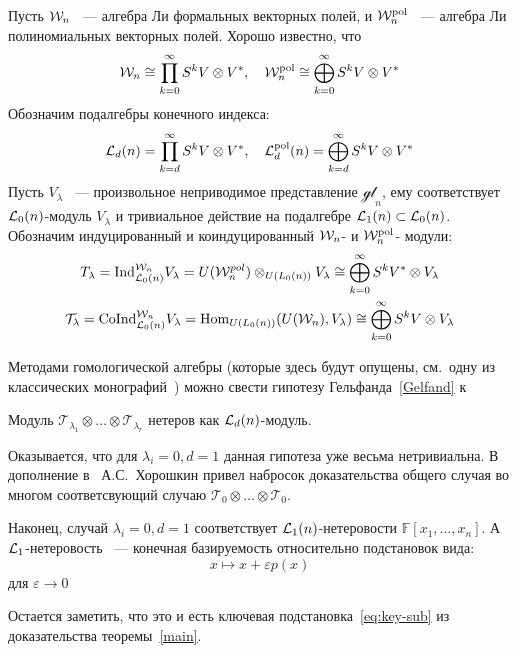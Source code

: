 Пусть $\mathcal{W}_n$ ~--- алгебра Ли формальных векторных полей, и $\mathcal{W}^{\mathrm{pol}}_n$ ~--- алгебра Ли полиномиальных векторных полей.
Хорошо известно, что
\[
    \mathcal{W}_n \cong \prod\limits_{k=0}^{\infty} S^k V\otimes V^*, \quad \mathcal{W}^{\mathrm{pol}}_n \cong \bigoplus\limits_{k=0}^{\infty} S^k V\otimes V^*
\]
Обозначим подалгебры конечного индекса:
\[
    \mathcal{L}_d(n) = \prod\limits_{k=d}^{\infty} S^k V\otimes V^*, \quad \mathcal{L}^{\mathrm{pol}}_d(n) = \bigoplus\limits_{k=d}^{\infty} S^k V\otimes V^*
\]
Пусть $V_{\lambda}$ ~--- произвольное неприводимое представление $\mathcal{gl}_n$, ему соответствует $\mathcal{L}_0(n)$-модуль $V_{\lambda}$ и тривиальное действие на подалгебре $\mathcal{L}_1(n)\subset\mathcal{L}_0(n)$.
Обозначим индуцированный и коиндуцированный $\mathcal{W}_n$- и $\mathcal{W}^{\mathrm{pol}}_n$- модули:
\begin{gather*}
    T_{\lambda} = \mathrm{Ind}^{\mathcal{W}_n}_{\mathcal{L}_0(n)} V_{\lambda} = U(\mathcal{W}_n^{pol}) \otimes_{U(L_0(n))} V_{\lambda} \cong \bigoplus_{k=0}^{\infty} S^k V^*\otimes V_{\lambda} \\
    \mathcal{T}_{\lambda} = \mathrm{CoInd}^{\mathcal{W}_n}_{\mathcal{L}_0(n)} V_{\lambda} = \operatorname{Hom}_{U(L_0(n))}(U(\mathcal{W}_n), V_{\lambda}) \cong \bigoplus_{k=0}^{\infty} S^k V\otimes V_{\lambda}
\end{gather*}

Методами гомологической алгебры (которые здесь будут опущены, см.\ одну из классических монографий~\cite{Fuks}) можно свести гипотезу Гельфанда~\ref{Gelfand} к

\vskip 0.1in\noindent
\begin{conjecture}
    Модуль $\mathcal{T}_{\lambda_1}\otimes\ldots\otimes\mathcal{T}_{\lambda_r}$ нетеров как $\mathcal{L}_d(n)$-модуль.
\end{conjecture}
\vskip 0.1in\noindent

Оказывается, что для $\lambda_i=0, d=1$ данная гипотеза уже весьма нетривиальна.
В дополнение в~\cite{Feigin-Kanel-Khoroshkin} А.С.\ Хорошкин привел набросок доказательства общего случая во многом соответсвующий случаю $\mathcal{T}_{0}\otimes\ldots\otimes\mathcal{T}_{0}$.

Наконец, случай $\lambda_i=0, d=1$ соответствует $\mathcal{L}_1(n)$-нетеровости $\mathbb{F}[x_1, \ldots, x_n]$.
А $\mathcal{L}_1$-нетеровость ~--- конечная базируемость относительно подстановок вида:
\[
    x \mapsto x + \varepsilon p(x)
\]
для $\varepsilon\to 0$

Остается заметить, что это и есть ключевая подстановка~\ref{eq:key-sub} из доказательства теоремы~\ref{main}.